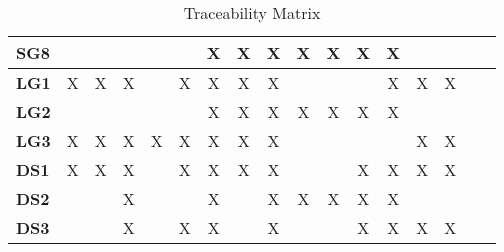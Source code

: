 \documentclass[12pt]{article}
\begin{document}
\begin{table}[H]
\begin{adjustwidth}{-0.1in}{-1in}
{\begin{tabular}{c|c|c|c|c|c|c|c|c|c|c|c|c|c|c|c|c|}
\multicolumn{1}{|l|}{\textbf{SG8}}   &              &              &              &              &              &      X       &       X      &       X      &       X      &       X      &       X      &       X      &              &              &              &               \\ \hline
\multicolumn{1}{|l|}{\textbf{LG1}}   &      X       &      X       &       X      &              &       X      &      X       &       X      &       X      &              &              &              &       X      &       X      &       X      &              &               \\ \hline
\multicolumn{1}{|l|}{\textbf{LG2}}   &              &              &              &              &              &      X       &       X      &       X      &       X      &       X      &       X      &       X      &              &              &              &               \\ \hline
\multicolumn{1}{|l|}{\textbf{LG3}}   &      X       &      X       &       X      &       X      &       X      &      X       &       X      &       X      &              &              &              &              &       X      &       X      &              &               \\ \hline
\multicolumn{1}{|l|}{\textbf{DS1}}   &      X       &      X       &       X      &              &       X      &      X       &       X      &       X      &              &              &       X      &       X      &       X      &       X      &              &               \\ \hline
\multicolumn{1}{|l|}{\textbf{DS2}}   &              &              &       X      &              &              &      X       &              &       X      &       X      &       X      &       X      &       X      &              &              &              &               \\ \hline
\multicolumn{1}{|l|}{\textbf{DS3}}   &              &              &       X      &              &       X      &      X       &              &       X      &              &              &       X      &       X      &       X      &       X      &              &               \\ \hline

\end{tabular}

}
\caption{Traceability Matrix}
    \label{tab:matrix1}
\end{adjustwidth}
\end{table}
\end{document}
